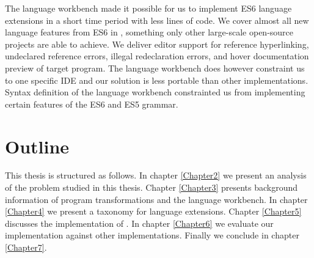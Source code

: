 The language workbench made it possible for us to implement ES6 language extensions in a short time period with less lines of code. We cover almost all new language features from ES6 in \projectname, something only other large-scale open-source projects are able to achieve. We deliver editor support for reference hyperlinking, undeclared reference errors, illegal redeclaration errors, and hover documentation preview of target program. The language workbench does however constraint us to one specific IDE and our solution is less portable than other implementations. Syntax definition of the language workbench constrainted us from implementing certain features of the ES6 and ES5 grammar.

\section{Outline}
This thesis is structured as follows. In chapter \ref{Chapter2} we present an analysis of the problem studied in this thesis. Chapter \ref{Chapter3} presents background information of program transformations and the language workbench. In chapter \ref{Chapter4} we present a taxonomy for language extensions.  Chapter \ref{Chapter5} discusses the implementation of \projectname. In chapter \ref{Chapter6} we evaluate our implementation against other implementations. Finally we conclude in chapter \ref{Chapter7}.